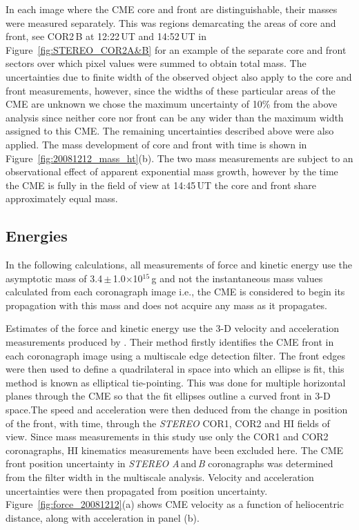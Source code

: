 In each image where the CME core and front are distinguishable, their masses were measured separately. This was regions demarcating the areas of core and front, see COR2\,B at 12:22\,UT and 14:52\,UT in Figure~\ref{fig:STEREO_COR2A&B} for an example of the separate core and front sectors over which pixel values were summed to obtain total mass. The uncertainties due to finite width of the observed object also apply to the core and front measurements, however, since the widths of these particular areas of the CME are unknown we chose the maximum uncertainty of 10\% from the above analysis since neither core nor front can be any wider than the maximum width assigned to this CME. The remaining uncertainties described above were also applied. The mass development of core and front with time is shown in Figure~\ref{fig:20081212_mass_ht}(b). The two mass measurements are subject to an observational effect of apparent exponential mass growth, however by the time the CME is fully in the field of view 
at 14:45\,UT the core and front share approximately equal mass. 


\subsection{Energies}\label{sec:2}

In the following calculations, all measurements of force and kinetic energy use the asymptotic mass of 3.4\,$\pm$\,1.0$\times$10$^{15}$\,g and not the instantaneous mass values calculated from each coronagraph image i.e., the CME is considered to begin its propagation with this mass and does not acquire any mass as it propagates. 

Estimates of the force and kinetic energy use the 3-D velocity and acceleration measurements produced by \citet{byrne2010}. Their method firstly identifies the CME front in each coronagraph image using a multiscale edge detection filter. The front edges were then used to define a quadrilateral in space into which an ellipse is fit, this method is known as elliptical tie-pointing. This was done for multiple horizontal planes through the CME so that the fit ellipses outline a curved front in 3-D space.The speed and acceleration were then deduced from the change in position of the front, with time, through the \emph{STEREO} COR1, COR2 and HI fields of view. Since mass measurements in this study use only the COR1 and COR2 coronagraphs, HI kinematics measurements have been excluded here. The CME front position uncertainty in \emph{STEREO A}\,and\,\emph{B} coronagraphs was determined from the filter width in the multiscale analysis. Velocity and acceleration uncertainties were then propagated from position uncertainty.  Figure~\ref{fig:force_20081212}(a) shows CME velocity as a function of heliocentric distance, along with acceleration in panel (b). 

